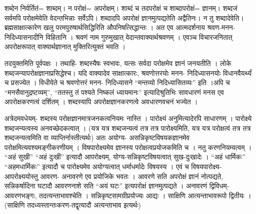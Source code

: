 शब्देन निर्वर्तितं= शाब्दम्। न परोक्षं= अपरोक्षम्। शाब्दं च तदपरोक्षं च शाब्दापरोक्षं= ज्ञानम्। शब्दजं सर्वमपि परोक्षमेवेति वेदन्तभिन्नाः सर्वेऽपि। शब्दादपि अपरोक्षं ज्ञानमुत्पद्यतेति अद्वैतिनः। न तु शब्दादेवेति। ब्रह्मसाक्षात्कारेण खलु परमपुरुषार्थसिद्धिरिति औपनिषत्सिद्धान्तः । अत एव आत्मदर्शनाय श्रवण-मनन-निदिध्यासनादीनि विहितानि । श्रवणं नाम गुरुमुखात् वेदान्तवाक्यार्थश्रवणम् । एवञ्च विचारजनितात् अपरोक्षरूपात् वाक्यार्थज्ञानात् मुक्तिरित्युक्तं भवति ।

तदयुक्तमिति पूर्वपक्षः । तथाहि- शब्दस्यैषः स्वभावः, यत्सः सर्वदा परोक्षमेव ज्ञानं जनयतीति । लोके शब्दजन्यापरोक्षज्ञानाप्रसिद्धेश्च। यदि वाक्यादेव साक्षात्कारः, श्रवणोत्तरयोः मनन- निदिध्यासनयोः विधानवैयर्थ्यं च प्रसज्येत । विधीयेते च श्रवणोत्तरं मनन- निदिध्यासने “मन्तव्यो निदिध्यासितव्यः” इति ।अपि च “मनसैवानुद्रष्टव्यम्”, “ततस्तु तं पश्यते निष्कलं ध्यायमानः” इत्यादिश्रुतिभिः सावधारणं मनस एव अपरोक्षकरणत्वं दर्शितम् । शब्दस्यापि अपरोक्षज्ञानकरणत्वे अवधारणवचनं भज्येत ।

अत्रेदमवधेयम्- शब्दस्य परोक्षज्ञानमात्रजनकत्वनियमः नास्ति । पारोक्ष्यं अनुमित्यादेरपि साधारणम् । पारोक्ष्ये शब्दजन्यत्वस्य अनवच्छेदकत्वात् । (यत्र यत्र शब्दजन्यत्वं तत्र तत्र पारोक्ष्यमिति, यत्र यत्र परोक्षत्वं तत्र तत्र शब्दजन्यत्वमिति वा व्याप्तिर्नास्तीत्यर्थः) अतः अयोग्य- असन्निकृष्टविषयकज्ञानमेव परोक्षमित्यवश्यमङ्गीकरणीयम् । विषपारोक्ष्यमेव ज्ञानस्य परोक्षत्वप्रयोजकमिति च । नतु करणनियम्यत्वम् । “अहं सुखी” “अहं दुःखी” इत्यादौ आपरोक्ष्यम्, योग्य-सन्निकृष्टविषयत्वात् सुख-दुःखादेः । “अहं धार्मिकः” “अहमधार्मिकः” इत्यादौ च पारोक्ष्यमेव अयोग्यत्वात् धर्माधर्मादेः विषयस्य । एवं च विषयपारोक्ष्य- आपरोक्ष्ययोस्तु आवरण- अनावरणे एव प्रयोजिके भवतः । आवरणे सति अपरोक्षं ज्ञानं नोत्पद्यते, सन्निकर्षादिना घटादौ आवरणनाशे सति “अयं घटः” इत्यपरोक्षं ज्ञानमुत्पद्यते । अनावरणं द्विविधम्- आवरणभङ्गः, तदत्यन्ताभावश्चेति । सन्निकृष्टसामग्रीप्रयोज्यः आद्यः । साक्षिणि आत्यन्ताभावरूपो द्वितीयः ।(साक्षिणि तदध्यस्तान्तःकरण-तद्वृत्यादौ अत्यन्ताभाव इत्यर्थः)

